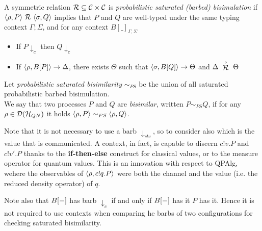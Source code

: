 \begin{definition}
	A symmetric relation $\mathcal{R} \subseteq \mathcal{C} \times \mathcal{C}$ is \emph{probabilistic saturated (barbed) bisimulation} if $\confw{\rho, P} \ \rel\ \confw{\sigma, Q}$ implies that $P$ and $Q$  are well-typed under the same typing context $\Gamma; \Sigma$, and for any context $B[\_]_{\Gamma, \Sigma}$
	\begin{itemize}
		\item If $P \downarrow_{c}$ then $Q \downarrow_{c}$
		\item If $\langle\rho, B[P]\rangle \rightarrow \Delta$, there exists $\Theta$ such that $\langle\sigma, B[Q]\rangle \rightarrow \Theta$ and $\Delta\ \slift{\rel}\ \Theta$
	\end{itemize}
	Let \emph{probabilistic saturated bisimilarity} $\sim_{PS}$ be the union of all saturated probabilistic barbed bisimulation. \\
	We say that two {processes} $P$ and $Q$ are \emph{bisimilar}, written $P \sim_{PS} Q$, if for any $\rho \in \mathcal{D}(\mathcal{H}_{QN})$ it holds $\langle\rho, P\rangle \sim_{PS} \langle\rho, Q\rangle$.
\end{definition}

Note that it is not necessary to use a barb $\downarrow_{c!v}$, so to consider also which is the value that is communicated. A context, in fact, is capable to discern $c!v.P$ and $c!v'.P$ thanks to the \textbf{if-then-else} construct for classical values, or to the measure operator for quantum values. This is an innovation with respect to QPAlg, wehere the observables of $\langle\rho, c!q.P\rangle$ were both the channel and the value (i.e. the reduced density operator) of $q$. 

Note also that $B[{-}]$ has barb $\downarrow_c$ if and only if $B[{-}]$ has it $P$ has it. Hence it is not required to use contexts when comparing  he barbs of two configurations for checking saturated bisimilarity. 


